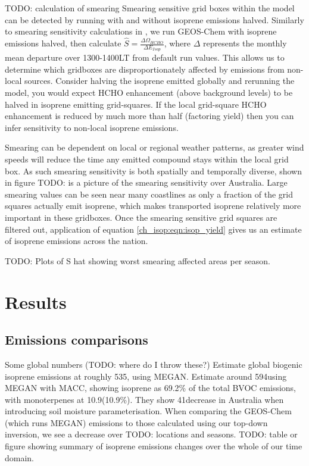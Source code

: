     TODO: calculation of smearing
    Smearing sensitive grid boxes within the model can be detected by running with and without isoprene emissions halved.
    Similarly to smearing sensitivity calculations in \textcite{Marais2012}, we run GEOS-Chem with isoprene emissions halved, then calculate $\hat{S} = \frac{\Delta \Omega_{HCHO}}{\Delta E_{Isop}} $, where $\Delta$ represents the monthly mean departure over 1300-1400LT from default run values.
    This allows us to determine which gridboxes are disproportionately affected by emissions from non-local sources.
    Consider halving the isoprene emitted globally and rerunning the model, you would expect HCHO enhancement (above background levels) to be halved in isoprene emitting grid-squares.
    If the local grid-square HCHO enhancement is reduced by much more than half (factoring yield) then you can infer sensitivity to non-local isoprene emissions.
    
    Smearing can be dependent on local or regional weather patterns, as greater wind speeds will reduce the time any emitted compound stays within the local grid box.
    As such smearing sensitivity is both spatially and temporally diverse, shown in figure TODO: is a picture of the smearing sensitivity over Australia.
    Large smearing values can be seen near many coastlines as only a fraction of the grid squares actually emit isoprene, which makes transported isoprene relatively more important in these gridboxes.
    Once the smearing sensitive grid squares are filtered out, application of equation \ref{ch_isop:eqn:isop_yield} gives us an estimate of isoprene emissions across the nation.
    
    TODO: Plots of S hat showing worst smearing affected areas per season.
    
    
    
\section{Results}
  \label{BioIsop:Results}
  
  
  
  
  
  \subsection{Emissions comparisons}
    
    Some global numbers (TODO: where do I throw these?)
    \textcite{Guenther2012} Estimate global biogenic isoprene emissions at roughly 535\tgpyr, using MEGAN.
    \textcite{Sindelarova2014} Estimate around 594\tgpyr using MEGAN with MACC, showing isoprene as 69.2\% of the total BVOC emissions, with monoterpenes at 10.9\tgpyr (10.9\%).
    They show 41\tgpyr decrease in Australia when introducing soil moisture parameterisation.
    When comparing the GEOS-Chem (which runs MEGAN) emissions to those calculated using our top-down inversion, we see a decrease over TODO: locations and seasons.
    TODO: table or figure showing summary of isoprene emissions changes over the whole of our time domain.
    
